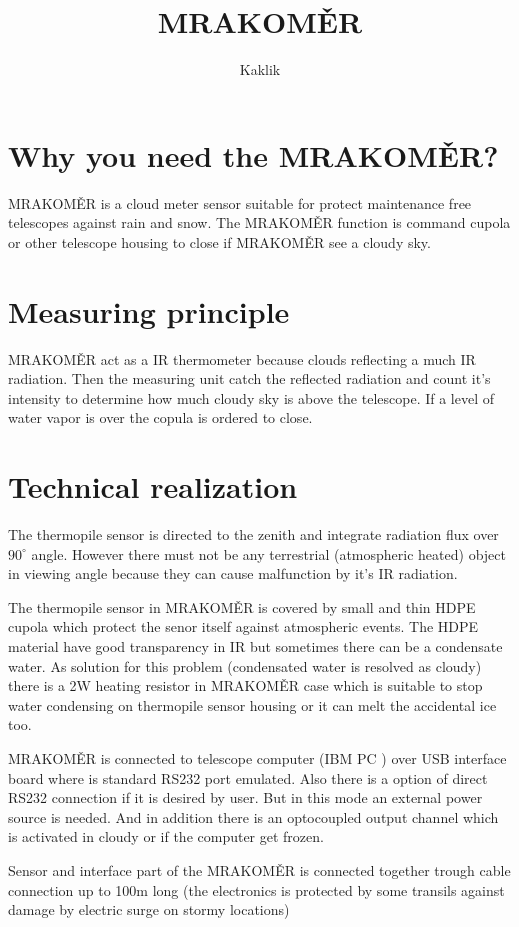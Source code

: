 \documentclass[10pt,a4paper]{article}
\author{Kaklik}
\title{MRAKOMĚR}
\begin{document}
\tableofcontents

\section{Why you need the MRAKOMĚR?}
MRAKOMĚR is a cloud meter sensor suitable for protect maintenance free telescopes against rain and snow. The MRAKOMĚR function is command cupola or other telescope housing to close if MRAKOMĚR see a cloudy sky. 

\section{Measuring principle}
MRAKOMĚR act as a IR thermometer because clouds reflecting a much IR radiation. Then the measuring unit catch the reflected radiation and count it's intensity to determine how much cloudy sky is above the telescope. If a level of water vapor is over the copula is ordered to close. 

\section{Technical realization}
The thermopile sensor is directed  to the zenith and integrate radiation flux over $90^\circ$ angle. However there must not be any terrestrial (atmospheric  heated) object in viewing  angle because they can cause malfunction by it's IR radiation.        

The thermopile sensor in MRAKOMĚR  is covered by small and thin HDPE cupola which protect the senor itself against atmospheric events. The HDPE material have good transparency in IR but sometimes there can be a condensate water. As solution for this problem (condensated water is resolved as cloudy) there is a 2W heating resistor in MRAKOMĚR case which is suitable to stop water condensing on thermopile sensor housing or it can melt the accidental ice too. 

MRAKOMĚR is connected to telescope computer (IBM PC ) over USB interface  board where is standard RS232 port emulated. Also there is a option of direct RS232 connection if it is desired by user. But in this mode an external power source is needed. And in addition there is an optocoupled output channel which is activated in cloudy or if the computer get frozen.

Sensor and interface part of the MRAKOMĚR is connected together trough  cable connection up to 100m long (the electronics is protected by some transils against damage by electric surge on stormy locations)
\end{document}
